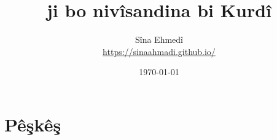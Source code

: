 \documentclass[14pt]{article}
\title{\textenglish{\XeLaTeX} ji bo nivîsandina bi Kurdî}
\author{Sîna Ehmedî \\ {\small \url{https://sinaahmadi.github.io/}}}
\date{\today}
\begin{document}
\maketitle
\tableofcontents

\begin{abstract}
\end{abstract}


\section{Pêşkêş}
\end{document}
